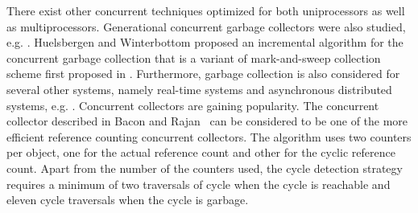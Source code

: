 There exist other concurrent techniques optimized for both uniprocessors as well as multiprocessors. Generational concurrent garbage collectors were also studied, e.g. \cite{Printezis:2000}. Huelsbergen and Winterbottom \cite{Huelsbergen1998} proposed an incremental algorithm for the concurrent garbage collection that is a variant of mark-and-sweep collection scheme first proposed in \cite{McCarthy1960}.
Furthermore, garbage collection is also considered for several other systems, namely real-time systems %
and asynchronous distributed systems, e.g. \cite{Pizlo2008,Veiga2005}.
Concurrent collectors are gaining popularity. The concurrent collector described in Bacon and Rajan~\cite{Bacon2001} can be considered to be one of the more efficient reference counting concurrent collectors. The algorithm uses two counters per object, one for the actual reference count and other for the cyclic reference count. Apart from the number of the counters used, the cycle detection strategy requires a minimum of two traversals of cycle when the cycle is reachable and eleven cycle traversals when the cycle is garbage.

